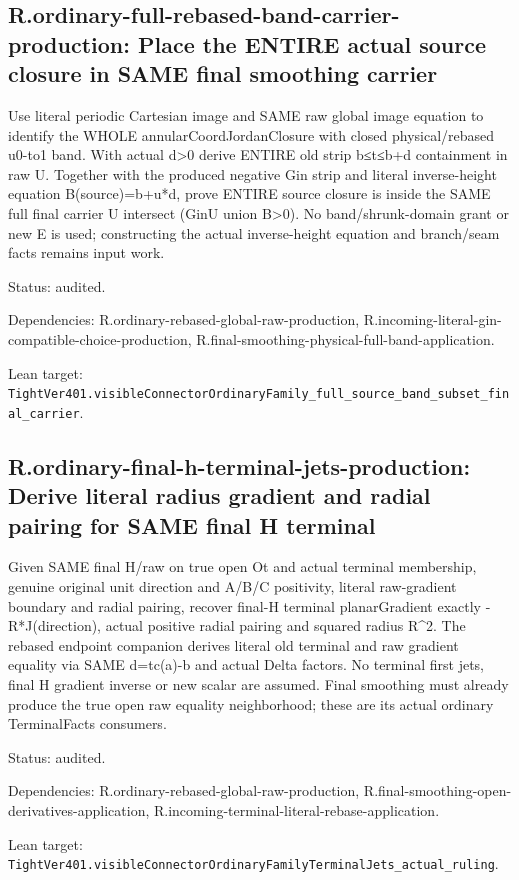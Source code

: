 \documentclass{article}
\begin{document}
\subsection*{R.ordinary-full-rebased-band-carrier-production: Place the ENTIRE actual source closure in SAME final smoothing carrier}
Use literal periodic Cartesian image and SAME raw global image equation to identify the WHOLE annularCoordJordanClosure with closed physical/rebased u0-to1 band. With actual d>0 derive ENTIRE old strip b≤t≤b+d containment in raw U. Together with the produced negative Gin strip and literal inverse-height equation B(source)=b+u*d, prove ENTIRE source closure is inside the SAME full final carrier U intersect (GinU union B>0). No band/shrunk-domain grant or new E is used; constructing the actual inverse-height equation and branch/seam facts remains input work.
\par Status: audited.
\par Dependencies: R.ordinary-rebased-global-raw-production, R.incoming-literal-gin-compatible-choice-production, R.final-smoothing-physical-full-band-application.
\par Lean target: \texttt{TightVer401.visibleConnectorOrdinaryFamily\_full\_source\_band\_subset\_final\_carrier}.
\subsection*{R.ordinary-final-h-terminal-jets-production: Derive literal radius gradient and radial pairing for SAME final H terminal}
Given SAME final H/raw on true open Ot and actual terminal membership, genuine original unit direction and A/B/C positivity, literal raw-gradient boundary and radial pairing, recover final-H terminal planarGradient exactly -R*J(direction), actual positive radial pairing and squared radius R^2. The rebased endpoint companion derives literal old terminal and raw gradient equality via SAME d=tc(a)-b and actual Delta factors. No terminal first jets, final H gradient inverse or new scalar are assumed. Final smoothing must already produce the true open raw equality neighborhood; these are its actual ordinary TerminalFacts consumers.
\par Status: audited.
\par Dependencies: R.ordinary-rebased-global-raw-production, R.final-smoothing-open-derivatives-application, R.incoming-terminal-literal-rebase-application.
\par Lean target: \texttt{TightVer401.visibleConnectorOrdinaryFamilyTerminalJets\_actual\_ruling}.
\end{document}
